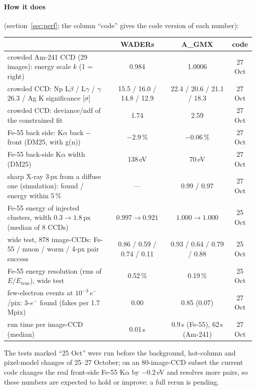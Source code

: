 \documentclass[11pt,a4paper]{article}
\newcommand{\el}{\ensuremath{e^-}}
\newcommand{\AGMX}{A\_GMX}
\begin{document}
\paragraph{How it does} (section~\ref{sec:perf}; the column ``code'' gives the code version of each number):

\begin{table}[H]\centering\small
\begin{tabularx}{\textwidth}{>{\raggedright\arraybackslash}X ccc}
\toprule
 & WADERs & \AGMX & code \\
\midrule
crowded Am-241 CCD (29 images): energy scale $k$ (1 = right) & 0.984 & 1.0006 & 27 Oct \\
crowded CCD: Np L$\beta$ / L$\gamma$ / $\gamma$\,26.3 / Ag K significance [$\sigma$] & 15.5 / 16.0 / 14.8 / 12.9 & 22.4 / 20.6 / 21.1 / 18.3 & 27 Oct \\
crowded CCD: deviance/ndf of the constrained fit & 1.74 & 2.59 & 27 Oct \\
Fe-55 back side: K$\alpha$ back $-$ front (DM25, with g(n)) & $-2.9\,\%$ & $-0.06\,\%$ & 27 Oct \\
Fe-55 back-side K$\alpha$ width (DM25) & 138\,eV & 70\,eV & 27 Oct \\
sharp X-ray 3\,px from a diffuse one (simulation): found / energy within 5\,\% & --- & 0.99 / 0.97 & 27 Oct \\
Fe-55 energy of injected clusters, width $0.3\to1.8$\,px (median of 8 CCDs) & $0.997\to0.921$ & $1.000\to1.000$ & 25 Oct \\
wide test, 878 image-CCDs: Fe-55 / muon / worm / 4-px pair success & 0.86 / 0.59 / 0.74 / 0.11 & 0.93 / 0.64 / 0.79 / 0.88 & 25 Oct \\
Fe-55 energy resolution (rms of $E/E_\mathrm{true}$), wide test & 0.52\,\% & 0.19\,\% & 25 Oct \\
few-electron events at $10^{-3}$\,\el/pix: 3-\el{} found (fakes per 1.7\,Mpix) & 0.00 & 0.85 (0.07) & 27 Oct \\
run time per image-CCD (median) & 0.01\,s & 0.9\,s (Fe-55), 62\,s (Am-241) & 27 Oct \\
\bottomrule
\end{tabularx}
\end{table}
\noindent The tests marked ``25 Oct'' were run before the background, hot-column and pixel-model changes of 25--27 October;
on an 80-image-CCD subset the current code changes the real front-side Fe-55 K$\alpha$ by $-0.2$\,eV and resolves more
pairs, so these numbers are expected to hold or improve; a full rerun is pending.
\end{document}
